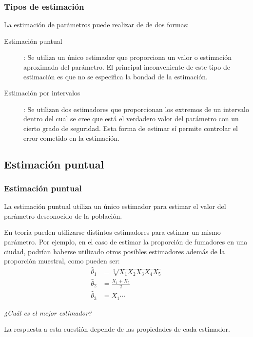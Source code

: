 \begin{frame}
\frametitle{Tipos de estimación}
La estimación de parámetros puede realizar de de dos formas:
\begin{description}
\item[Estimación puntual]: Se utiliza un único estimador que proporciona un valor o estimación aproximada del parámetro.
El principal inconveniente de este tipo de estimación es que no se especifica la bondad de la estimación.
\item[Estimación por intervalos]: Se utilizan dos estimadores que proporcionan los extremos de un intervalo dentro del cual se cree que está el verdadero valor del parámetro con un cierto grado de seguridad.
Esta forma de estimar sí permite controlar el error cometido en la estimación.
\end{description}

\begin{center}
\end{center}
\end{frame}


\subsection{Estimación puntual}
\begin{frame}
\frametitle{Estimación puntual}
La estimación puntual utiliza un único estimador para estimar el valor del parámetro desconocido de la población.

En teoría pueden utilizarse distintos estimadores para estimar un mismo parámetro. Por ejemplo, en el caso de estimar la proporción de fumadores en una ciudad, podrían haberse utilizado otros posibles estimadores además de la proporción muestral, como pueden ser:
\begin{align*}
\hat \theta_1 &= \sqrt[5]{X_1X_2X_3X_4X_5}\\
\hat \theta_2 &= \frac{X_1+X_5}{2}\\
\hat \theta_3 &= X_1 \cdots
\end{align*}

\begin{center}
\alert{\emph{¿Cuál es el mejor estimador?}}
\end{center}

La respuesta a esta cuestión depende de las propiedades de cada estimador.
\end{frame}


